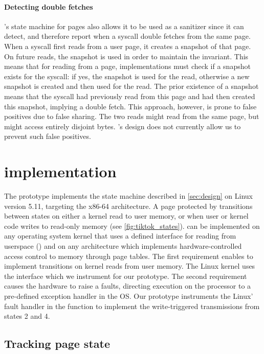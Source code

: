 \documentclass[letterpaper,twocolumn,10pt, anonymous]{article}
\begin{document}
\paragraph{Detecting double fetches}
\tiktok's state machine for pages also allows it to be used as a 
sanitizer since it can detect, and therefore report when a syscall 
double fetches from the same page.
When a syscall first reads from a user page, it creates a snapshot 
of that page.
On future reads, the snapshot is used in order to maintain the 
invariant.
This means that for reading from a page, implementations must check 
if a snapshot exists for the syscall: if yes, the snapshot is used
for the read, otherwise a new snapshot is created and then used 
for the read. 
The prior existence of a snapshot means that the syscall had previously
read from this page and had then created this snapshot, implying a double 
fetch.
This approach, however, is prone to false positives due to false sharing.
The two reads might read from the same page, but might access entirely 
disjoint bytes. 
\tiktok's design does not currently allow us to prevent such false positives.

\section{\tiktok implementation}
\label{sec:impl}

The \tiktok prototype implements the state machine described in 
\autoref{sec:design} on Linux version 5.11, targeting the x86-64 
architecture. 
A page protected by \tiktok transitions between states on 
either a kernel read to user memory, or when user or kernel code
writes to read-only memory (see \autoref{fig:tiktok_states}).
\tiktok can be implemented on any operating system kernel that uses 
a defined interface for reading from userspace () and
on any architecture which implements hardware-controlled access 
control to memory through page tables. 
The first requirement enables \tiktok to implement transitions on 
kernel reads from user memory.
The Linux kernel uses the  interface which 
we instrument for our prototype.
The second requirement causes the hardware to raise a faults, 
directing execution on the processor to a pre-defined exception 
handler in the OS.
Our prototype instruments the Linux' fault handler in the function 
 to implement the write-triggered transmissions 
from states 2 and 4.


\subsection{Tracking page state}
\end{document}
